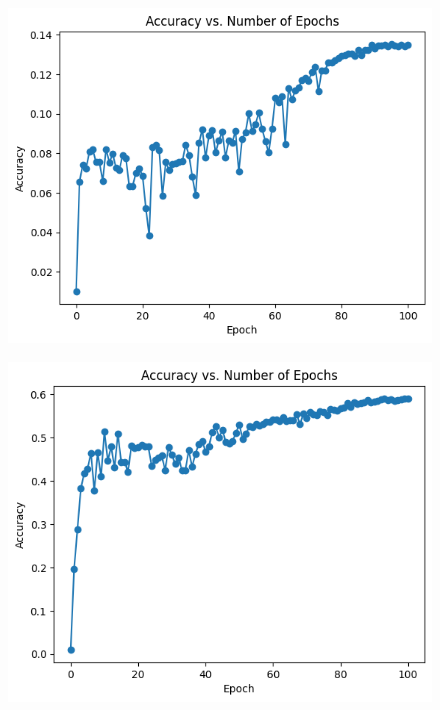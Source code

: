 \documentclass{article}
\begin{document}
\begin{figure}[h]
\centering
\begin{minipage}{.5\textwidth}
  \centering
  \includegraphics[width=.6\linewidth]{assets/softmax_ae.png}
  \newline
  \noindent
  \label{fig:test1}
\end{minipage}%
\begin{minipage}{.5\textwidth}
  \centering
  \includegraphics[width=.6\linewidth]{assets/log_softmax_ae.png}
  \newline
  \noindent
  \label{fig:test2}
\end{minipage}
\end{figure}
\end{document}

